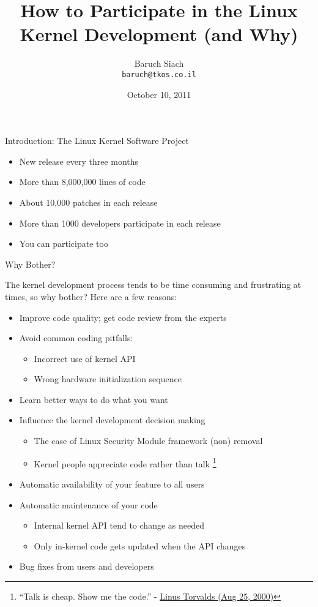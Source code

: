 \documentclass{beamer}
\title{How to Participate in the Linux Kernel Development (and Why)}
\institute{Tk Open Systems}
\author{Baruch Siach \\ \texttt{baruch@tkos.co.il}}
\date{October 10, 2011}
\begin{document}

\begin{frame}{Introduction: The Linux Kernel Software Project}
  \begin{itemize}
  \item New release every three months
  \item More than 8,000,000 lines of code
  \item About 10,000 patches in each release
  \item More than 1000 developers participate in each release
  \item You can participate too
  \end{itemize}
\end{frame}

\begin{frame}{Why Bother?}

  The kernel development process tends to be time consuming and
  frustrating at times, so why bother? Here are a few reasons:

  \begin{itemize}
  \item Improve code quality; get code review from the experts
  \item Avoid common coding pitfalls:
    \begin{itemize}
    \item Incorrect use of kernel API
    \item Wrong hardware initialization sequence
    \end{itemize}
  \item Learn better ways to do what you want
  \item Influence the kernel development decision making
    \begin{itemize}
    \item The case of Linux Security Module framework (non) removal
    \item Kernel people appreciate code rather than talk \footnote
      {``Talk is cheap. Show me the code.'' -
        \href{http://lkml.org/lkml/2000/8/25/132}{Linus Torvalds (Aug
          25, 2000)}} %
    \end{itemize}
  \item Automatic availability of your feature to all users
  \item Automatic maintenance of your code
    \begin{itemize}
    \item Internal kernel API tend to change as needed
    \item Only in-kernel code gets updated when the API changes
    \end{itemize}
  \item Bug fixes from users and developers
  \end{itemize}
\end{frame}
\end{document}
